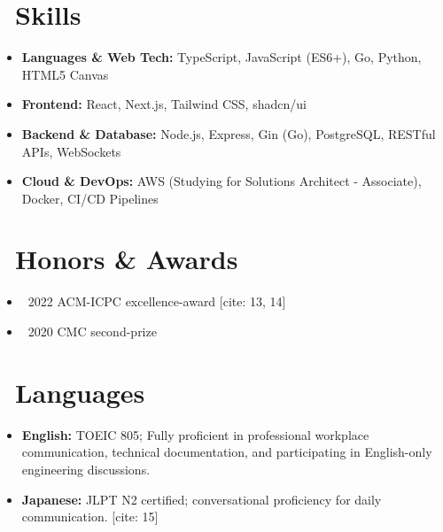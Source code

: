 \documentclass{resume}
\begin{document}
\section{\faCogs\ Skills}
\begin{itemize}[parsep=0.5ex]
  \item \textbf{Languages \& Web Tech:} TypeScript, JavaScript (ES6+), Go, Python, HTML5 Canvas 
  \item \textbf{Frontend:} React, Next.js, Tailwind CSS, shadcn/ui 
  \item \textbf{Backend \& Database:} Node.js, Express, Gin (Go), PostgreSQL, RESTful APIs, WebSockets 
  \item \textbf{Cloud \& DevOps:} AWS (Studying for Solutions Architect - Associate), Docker, CI/CD Pipelines 
\end{itemize}

\section{\faTrophy\ Honors \& Awards}
\begin{itemize}[parsep=0.5ex]
  \item {} \textbullet\ 2022 ACM-ICPC excellence-award [cite: 13, 14]
  \item {} \textbullet\ 2020 CMC second-prize 
\end{itemize}

\section{\faGlobe\ Languages}
\begin{itemize}[parsep=0.5ex]
  \item \textbf{English:} TOEIC 805; Fully proficient in professional workplace communication, technical documentation, and participating in English-only engineering discussions. 
  \item \textbf{Japanese:} JLPT N2 certified; conversational proficiency for daily communication. [cite: 15]
\end{itemize}
\end{document}
